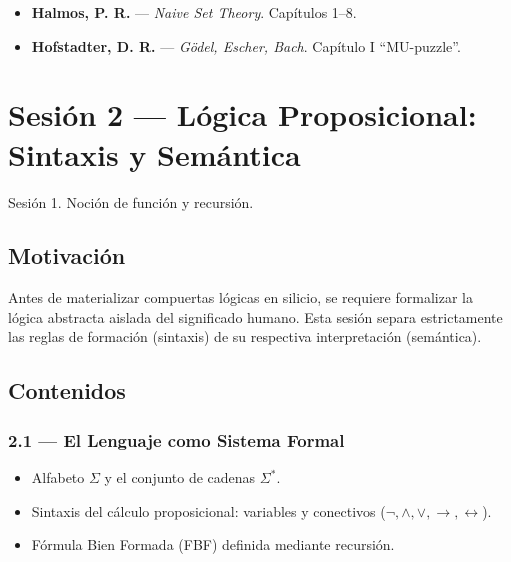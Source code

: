 \documentclass[11pt, letterpaper]{article}
\begin{document}
\begin{lecturas}
\begin{itemize}
  \item[$(\star)$] \textbf{Halmos, P. R.} --- \emph{Naive Set Theory}. Cap\'itulos 1--8.
  \item[$(\star)$] \textbf{Hofstadter, D. R.} --- \emph{G\"odel, Escher, Bach}. Cap\'itulo I ``MU-puzzle''.
\end{itemize}
\end{lecturas}

\newpage

\section{Sesi\'on 2 --- L\'ogica Proposicional: Sintaxis y Sem\'antica}

\begin{prereqs}
Sesi\'on 1. Noci\'on de funci\'on y recursi\'on.
\end{prereqs}

\subsection*{Motivaci\'on}
Antes de materializar compuertas l\'ogicas en silicio, se requiere formalizar la l\'ogica abstracta aislada del significado humano. Esta sesi\'on separa estrictamente las reglas de formaci\'on (sintaxis) de su respectiva interpretaci\'on (sem\'antica).

\subsection{Contenidos}

\subsubsection{2.1 --- El Lenguaje como Sistema Formal}
\begin{itemize}
  \item Alfabeto $\Sigma$ y el conjunto de cadenas $\Sigma^*$.
  \item Sintaxis del c\'alculo proposicional: variables y conectivos ($\neg, \land, \lor, \to, \leftrightarrow$).
  \item F\'ormula Bien Formada (FBF) definida mediante recursi\'on.
\end{itemize}
\end{document}
